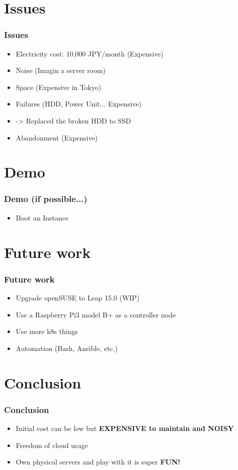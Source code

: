 \documentclass[aspectratio=169,11pt,hyperref={colorlinks=true}]{beamer}
\begin{document}
\section{Issues}
\begin{frame}
  \frametitle{Issues}
  \begin{itemize}
    \item Electricity cost: 10,000 JPY/month (Expensive)
    \item Noise (Imagin a server room)
    \item Space (Expensive in Tokyo)
    \item Failures (HDD, Power Unit... Expensive)
    \item[] -> Replaced the broken HDD to SSD
    \item Abandonment (Expensive)
  \end{itemize}
\end{frame}

\section{Demo}
\begin{frame}
  \frametitle{Demo (if possible...)}
  \begin{itemize}
    \item Boot an Instance
  \end{itemize}
\end{frame}

\section{Future work}
\begin{frame}
  \frametitle{Future work}
  \begin{itemize}
    \item Upgrade openSUSE to Leap 15.0 (WIP)
    \item Use a Raspberry Pi3 model B+ as a controller node
    \item Use more k8s things
    \item Automation (Bash, Ansible, etc.)
  \end{itemize}
\end{frame}

\section{Conclusion}
\begin{frame}
  \frametitle{Conclusion}
  \begin{itemize}
    \item Initial cost can be low but \bf{EXPENSIVE} to maintain and \bf{NOISY}
    \item Freedom of cloud usage
    \item Own physical servers and play with it is super \bf{FUN}!
  \end{itemize}
\end{frame}
\end{document}
